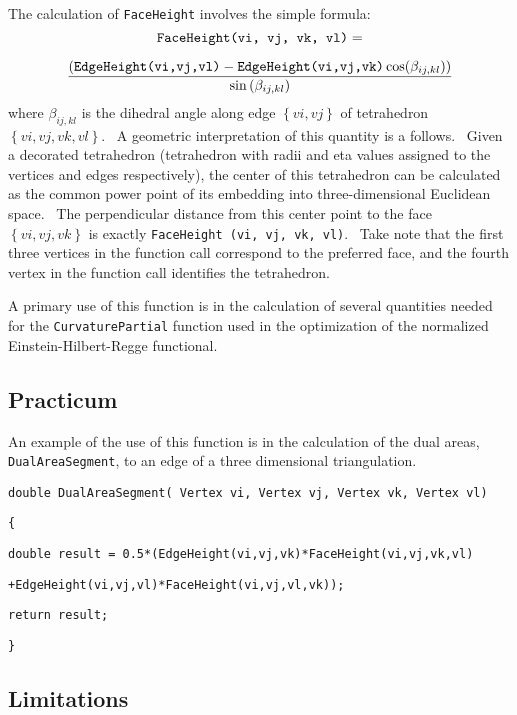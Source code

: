 The calculation of \texttt{FaceHeight} involves the simple formula:%
\begin{equation*}
\text{\texttt{FaceHeight(vi, vj, vk, vl)}}=
\end{equation*}

\begin{equation*}
\frac{\left( \text{\texttt{EdgeHeight(vi,vj,vl)}}-\text{\texttt{%
EdgeHeight(vi,vj,vk)}}\cos (\beta _{ij,kl})\right) }{\sin \left( \beta
_{ij,kl}\right) }
\end{equation*}%
where $\beta _{ij,kl}$ is the dihedral angle along edge $\left\{
vi,vj\right\} $ of tetrahedron $\left\{ vi,vj,vk,vl\right\} $. \ A geometric
interpretation of this quantity is a follows. \ Given a decorated
tetrahedron (tetrahedron with radii and eta values assigned to the vertices
and edges respectively), the center of this tetrahedron can be calculated as
the common power point of its embedding into three-dimensional Euclidean
space. \ The perpendicular distance from this center point to the face $%
\left\{ vi,vj,vk\right\} $ is exactly \texttt{FaceHeight (vi, vj, vk, vl)}.
\ Take note that the first three vertices in the function call correspond to
the preferred face, and the fourth vertex in the function call identifies
the tetrahedron. \ 

A primary use of this function is in the calculation of several quantities
needed for the \texttt{CurvaturePartial} function used in the optimization
of the normalized Einstein-Hilbert-Regge functional.

\subsection*{Practicum}

An example of the use of this function is in the calculation of the dual
areas, \texttt{DualAreaSegment}, to an edge of a three dimensional
triangulation.

\qquad \texttt{double DualAreaSegment( Vertex vi, Vertex vj, Vertex vk,
Vertex vl)}

\qquad\qquad\texttt{\{}

\qquad \qquad \texttt{double result =
0.5*(EdgeHeight(vi,vj,vk)*FaceHeight(vi,vj,vk,vl)}

\qquad \qquad \qquad \texttt{+EdgeHeight(vi,vj,vl)*FaceHeight(vi,vj,vl,vk));}

\qquad\qquad\texttt{return result;}

\qquad\qquad\texttt{\}}

\subsection*{Limitations}

